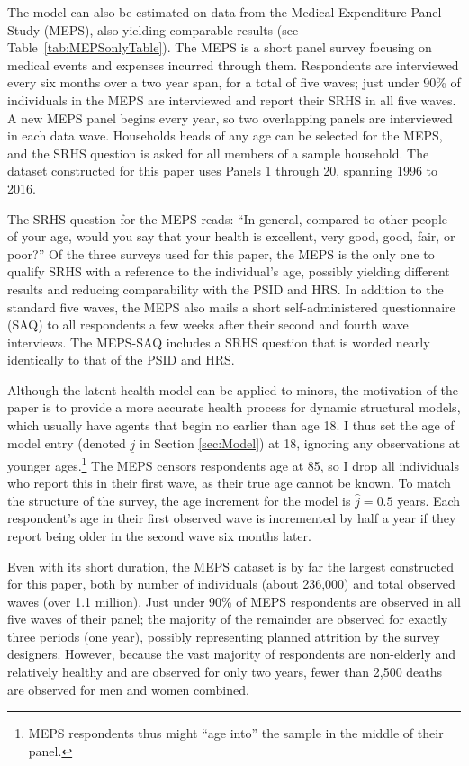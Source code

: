 \documentclass[12pt,pdftex,letterpaper]{article}
\newcommand{\Age}{j}
\newcommand{\AgeMin}{\underline{\Age}}
\newcommand{\AgeIncr}{\hat{\Age}}
\begin{document}
The model can also be estimated on data from the Medical Expenditure Panel Study (MEPS), also yielding comparable results (see Table~\ref{tab:MEPSonlyTable}). The MEPS is a short panel survey focusing on medical events and expenses incurred through them.  Respondents are interviewed every six months over a two year span, for a total of five waves; just under 90\% of individuals in the MEPS are interviewed and report their SRHS in all five waves.  A new MEPS panel begins every year, so two overlapping panels are interviewed in each data wave.  Households heads of any age can be selected for the MEPS, and the SRHS question is asked for all members of a sample household.  The dataset constructed for this paper uses Panels 1 through 20, spanning 1996 to 2016.

The SRHS question for the MEPS reads: ``In general, compared to other people of your age, would you say that your health is excellent, very good, good, fair, or poor?''  Of the three surveys used for this paper, the MEPS is the only one to qualify SRHS with a reference to the individual's age, possibly yielding different results and reducing comparability with the PSID and HRS.  In addition to the standard five waves, the MEPS also mails a short self-administered questionnaire (SAQ) to all respondents a few weeks after their second and fourth wave interviews. The MEPS-SAQ includes a SRHS question that is worded nearly identically to that of the PSID and HRS.

Although the latent health model can be applied to minors, the motivation of the paper is to provide a more accurate health process for dynamic structural models, which usually have agents that begin no earlier than age 18.  I thus set the age of model entry (denoted $\AgeMin$ in Section \ref{sec:Model}) at 18, ignoring any observations at younger ages.\footnote{MEPS respondents thus might ``age into'' the sample in the middle of their panel.}  The MEPS censors respondents age at 85, so I drop all individuals who report this in their first wave, as their true age cannot be known.  To match the structure of the survey, the age increment for the model is $\AgeIncr=0.5$ years.  Each respondent's age in their first observed wave is incremented by half a year if they report being older in the second wave six months later.

Even with its short duration, the MEPS dataset is by far the largest constructed for this paper, both by number of individuals (about 236,000) and total observed waves (over 1.1 million).  Just under 90\% of MEPS respondents are observed in all five waves of their panel; the majority of the remainder are observed for exactly three periods (one year), possibly representing planned attrition by the survey designers.  However, because the vast majority of respondents are non-elderly and relatively healthy and are observed for only two years, fewer than 2,500 deaths are observed for men and women combined.
\end{document}

